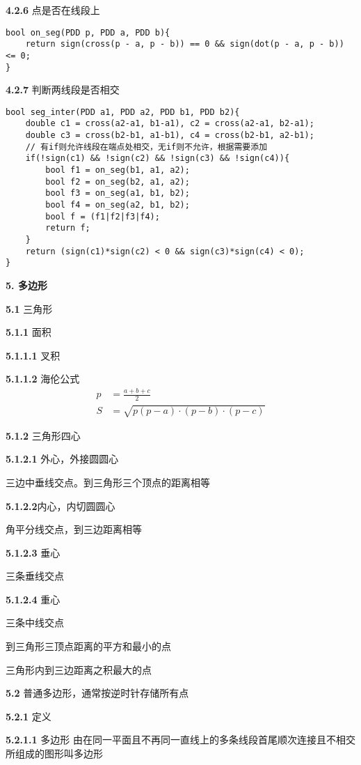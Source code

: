\documentclass[12pt]{article}
\begin{document}
\textbf{4.2.6} 点是否在线段上

\begin{lstlisting}[style=C++]
bool on_seg(PDD p, PDD a, PDD b){
	return sign(cross(p - a, p - b)) == 0 && sign(dot(p - a, p - b)) <= 0;
}
\end{lstlisting}

\textbf{4.2.7} 判断两线段是否相交

\begin{lstlisting}[style=C++]
bool seg_inter(PDD a1, PDD a2, PDD b1, PDD b2){
	double c1 = cross(a2-a1, b1-a1), c2 = cross(a2-a1, b2-a1);
	double c3 = cross(b2-b1, a1-b1), c4 = cross(b2-b1, a2-b1);
	// 有if则允许线段在端点处相交，无if则不允许，根据需要添加
	if(!sign(c1) && !sign(c2) && !sign(c3) && !sign(c4)){
		bool f1 = on_seg(b1, a1, a2);
		bool f2 = on_seg(b2, a1, a2);
		bool f3 = on_seg(a1, b1, b2);
		bool f4 = on_seg(a2, b1, b2);
		bool f = (f1|f2|f3|f4);
		return f;
	}
	return (sign(c1)*sign(c2) < 0 && sign(c3)*sign(c4) < 0);
}
\end{lstlisting}

\textbf{5. 多边形}

\textbf{5.1} 三角形

\textbf{5.1.1} 面积

\textbf{5.1.1.1} 叉积

\textbf{5.1.1.2} 海伦公式
$$
\begin{aligned}
	p &= \frac{a + b + c}{2}\\
	S &= \sqrt{p(p - a)\cdot(p - b)\cdot(p - c)}
\end{aligned}
$$

\textbf{5.1.2} 三角形四心

\textbf{5.1.2.1} 外心，外接圆圆心

三边中垂线交点。到三角形三个顶点的距离相等

\textbf{5.1.2.2}内心，内切圆圆心

角平分线交点，到三边距离相等

\textbf{5.1.2.3} 垂心

三条垂线交点

\textbf{5.1.2.4} 重心

三条中线交点

到三角形三顶点距离的平方和最小的点

三角形内到三边距离之积最大的点

\textbf{5.2} 普通多边形，通常按逆时针存储所有点

\textbf{5.2.1} 定义

\textbf{5.2.1.1} 多边形
由在同一平面且不再同一直线上的多条线段首尾顺次连接且不相交所组成的图形叫多边形
\end{document}
